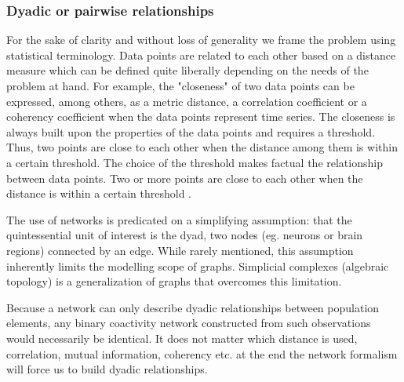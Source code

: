 \documentclass[onecollarge,runningheads]{svjour2}
\begin{document}
\subsubsection{Dyadic or pairwise relationships}
\label{sse:dy}
For the sake of clarity and without loss of generality we frame the problem using statistical terminology.
Data points are related to each other based on a distance measure which can be defined quite liberally depending on the needs of the problem at hand. For example, the "closeness" of two data points can be expressed, among others, as a metric distance, a correlation coefficient or a coherency coefficient when the data points represent time series.
The closeness is always built upon the properties of the data points and requires a threshold. Thus, two points are close to each other when the distance among them is within a certain threshold. The choice of the threshold makes factual the relationship between data points. Two or more points are close to each other when the distance is within a certain threshold \cite{giusti2016two}.

The use of networks is predicated on a simplifying assumption: that the quintessential unit of interest is the dyad, two nodes (eg. neurons or brain regions) connected by an edge. While rarely mentioned, this assumption inherently limits the modelling scope of graphs. Simplicial complexes (algebraic topology) is a generalization of graphs that overcomes this limitation.



Because a network can only describe dyadic relationships between population elements, any binary coactivity network constructed from such observations would necessarily be identical. It does not matter which distance is used, correlation, mutual information, coherency etc. at the end the network formalism will force us to build dyadic relationships.
\end{document}
